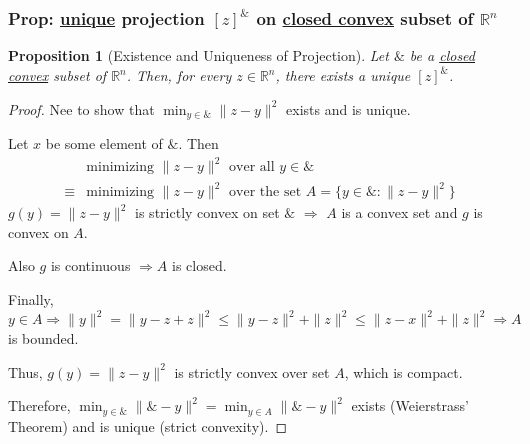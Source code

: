 \documentclass[11pt,a4paper]{article}
\newtheorem{proposition}{Proposition}
\begin{document}
\subsubsection{Prop: \underline{unique} projection $[z]^\&$ on \underline{closed convex} subset of $\mathbb{R}^n$}
\begin{proposition}
    [Existence and Uniqueness of Projection]
    Let $\&$ be a \underline{closed convex} subset of $\mathbb{R}^n$. Then, for every $z\in \mathbb{R}^n$, there exists a unique $[z]^\&$.
\end{proposition}
\begin{proof}
Nee to show that $\min_{y\in \&}\|z-y\|^2$ exists and is unique.

Let $x$ be some element of $\&$. Then
\begin{equation}
    \begin{aligned}
        &\text{minimizing $\|z-y\|^2$ over all $y\in\&$}\\
        \equiv&\text{minimizing $\|z-y\|^2$ over the set $A=\{y\in\&:\|z-y\|^2\}$}
    \end{aligned}
    \nonumber
\end{equation}
$g(y)=\|z-y\|^2$ is strictly convex on set $\&$ $\Rightarrow$ $A$ is a convex set and $g$ is convex on $A$.

Also $g$ is continuous $\Rightarrow	A$ is closed.

Finally, $y\in A \Rightarrow \|y\|^2=\|y-z+z\|^2\leq \|y-z\|^2+\|z\|^2\leq \|z-x\|^2+\|z\|^2 \Rightarrow A$ is bounded.

Thus, $g(y)=\|z-y\|^2$ is strictly convex over set $A$, which is compact.

Therefore, $\min_{y\in\&}\|\&-y\|^2=\min_{y\in A}\|\&-y\|^2$ exists (Weierstrass’ Theorem) and is unique (strict convexity).
\end{proof}
\end{document}
